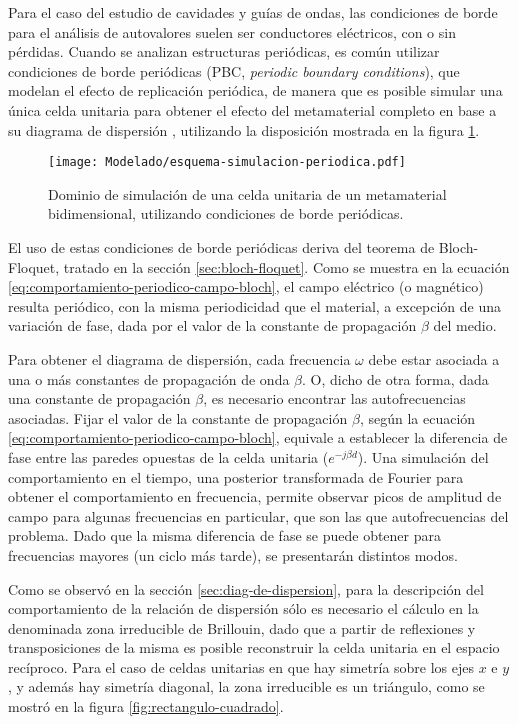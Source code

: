 Para el caso del estudio de cavidades y guías de ondas, las condiciones de borde para el análisis de autovalores suelen ser conductores eléctricos, con o sin pérdidas. Cuando se analizan estructuras periódicas, es común utilizar condiciones de borde periódicas (PBC, \textit{periodic boundary conditions}), que modelan el efecto de replicación periódica, de manera que es posible simular una única celda unitaria para obtener el efecto del metamaterial completo en base a su diagrama de dispersión \cite{Yang:EBGAntennas}, utilizando la disposición mostrada en la figura \ref{fig:esquema-simulacion-periodica}.

\begin{figure}[h]
	\centering
	\texttt{[image: Modelado/esquema-simulacion-periodica.pdf]}
	\caption{Dominio de simulación de una celda unitaria de un metamaterial bidimensional, utilizando condiciones de borde periódicas.}
	\label{fig:esquema-simulacion-periodica}
\end{figure}

El uso de estas condiciones de borde periódicas deriva del teorema de Bloch-Floquet, tratado en la sección \ref{sec:bloch-floquet}. Como se muestra en la ecuación \ref{eq:comportamiento-periodico-campo-bloch}, el campo eléctrico (o magnético) resulta periódico, con la misma periodicidad que el material, a excepción de una variación de fase, dada por el valor de la constante de propagación $\beta$ del medio.

Para obtener el diagrama de dispersión, cada frecuencia $\omega$ debe estar asociada a una o más constantes de propagación de onda $\beta$. O, dicho de otra forma, dada una constante de propagación $\beta$, es necesario encontrar las autofrecuencias asociadas. Fijar el valor de la constante de propagación $\beta$, según la ecuación \ref{eq:comportamiento-periodico-campo-bloch}, equivale a establecer la diferencia de fase entre las paredes opuestas de la celda unitaria ($e^{-j\beta d}$). Una simulación del comportamiento en el tiempo, una posterior transformada de Fourier para obtener el comportamiento en frecuencia, permite observar picos de amplitud de campo para algunas frecuencias en particular, que son las que autofrecuencias del problema. Dado que la misma diferencia de fase se puede obtener para frecuencias mayores (un ciclo más tarde), se presentarán distintos modos.

Como se observó en la sección \ref{sec:diag-de-dispersion}, para la descripción del comportamiento de la relación de dispersión sólo es necesario el cálculo en la denominada zona irreducible de Brillouin, dado que a partir de reflexiones y transposiciones de la misma es posible reconstruir la celda unitaria en el espacio recíproco. Para el caso de celdas unitarias en que hay simetría sobre los ejes $x$ e $y$, y además hay simetría diagonal, la zona irreducible es un triángulo, como se mostró en la figura \ref{fig:rectangulo-cuadrado}.

